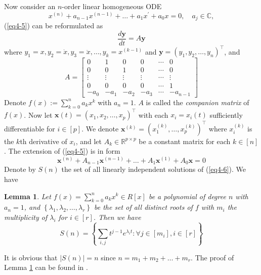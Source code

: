 \documentclass[11pt, oneside]{article}  %
\newtheorem{lem}[thm]{Lemma}
\newcommand{\abs}[1]{\left\vert#1\right\vert}
\newcommand{\set}[1]{\left\{#1\right\}}
\newcommand{\la}{\lambda}
\newcommand{\p}{\prime}
\newcommand{\bbC}{\mathbb{C}}
\newcommand{\RR}{\mathbb{R}}
\newcommand{\bft}{\textbf{t}}
\newcommand{\bx}{\textbf{x}}
\newcommand{\by}{\textbf{y}}
\newcommand{\beq}{\begin{equation}}
\newcommand{\eeq}{\end{equation}}
\begin{document}
Now consider an $n$-order linear homogeneous ODE  
\beq\label{eq4-5}
  x^{(n)}+ a_{n-1}x^{(n-1)}+\ldots+ a_1x^{\p} +a_0x=0, \quad  a_{j}\in \bbC,
\eeq
(\ref{eq4-5}) can be reformulated as 
\beq\label{eq4-6}
\frac{d\by}{dt} = A\by  
\eeq 
where $y_{1}=x, y_{2}=\dot{x}, y_{3}=\ddot{x}, \ldots, y_{k}=x^{(k-1)}$ and $\by=(y_{1},y_{2},\ldots, y_{n})^{\top}$, and 
\beq\label{eq4-7}
A = \begin{bmatrix} 
0 & 1&0&0&\cdots & 0\\  
0 & 0&1&0&\cdots & 0\\  
\vdots & \vdots &\vdots &\vdots &\cdots & \vdots \\
0 & 0&0&0&\cdots & 1\\
-a_{0} & -a_{1}&-a_{2}&-a_{3}&\cdots & -a_{n-1}\end{bmatrix} 
\eeq 
Denote $f(x):=\sum_{k=0}^{n} a_k x^k$ with $a_n=1$.  $A$ is called the \emph{companion matrix} of  $f(x)$. Now let 
$\bx(t)=(x_{1},x_{2},\ldots,x_{p})^{\top}$ with each $x_i=x_{i}(t)$ sufficiently differentiable for $i\in [p]$.  We denote 
$\bx^{(k)}=(x_{1}^{(k)},\ldots, x_{p}^{(k)})^{\top}$ where $x_{i}^{(k)}$ is the $k$th derivative of $x_i$, and let 
$A_{k}\in\RR^{p\times p}$ be a constant matrix for each $k\in [n]$.  The extension of (\ref{eq4-5}) is in form 
\beq\label{eq4-8}
\bx^{(n)} + A_{n-1}\bx^{(n-1)}+\ldots +A_{1}\bx^{(1)} + A_{0}\bx = 0
\eeq
Denote by $S(n)$ the set of all linearly independent solutions of (\ref{eq4-6}). We have 
\begin{lem}\label{le4-2:unidiff}
Let $f(x) = \sum\limits_{k=0}^{n} a_{k}x^{k}\in R[x]$ be a polynomial of degree $n$ with $a_{n}=1$, and 
$\set{\la_{1},\la_{2},\ldots,\la_{r}}$ be the set of all distinct roots of $f$ with $m_{i}$ the multiplicity of $\la_{i}$ for $i\in [r]$.  
Then we have 
\beq\label{eq4-9}  
S(n) =\set{ \sum_{i,j} t^{j-1}e^{\la_{i}t}\colon  \forall j\in [m_{i}], i\in [r] }  
\eeq   
\end{lem}
It is obvious that $\abs{S(n)}=n$ since $n=m_{1}+m_{2}+\ldots + m_{r}$.  The proof of Lemma \ref{le4-2:unidiff} can be found in \cite{CC1997}.\\
\end{document}

